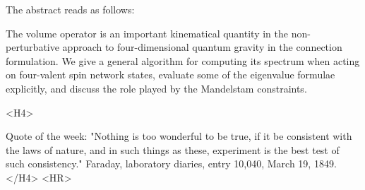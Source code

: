 The abstract reads as follows:

The volume operator is an important kinematical quantity in the
non-perturbative approach to four-dimensional quantum gravity in the
connection formulation. We give a general algorithm for computing its
spectrum when acting on four-valent spin network states, evaluate some
of the eigenvalue formulae explicitly, and discuss the role played by
the Mandelstam constraints.

<H4> 

Quote of the week: "Nothing is too wonderful to be true, if it be
consistent with the laws of nature, and in such things as these,
experiment is the best test of such consistency."  Faraday, laboratory
diaries, entry 10,040, March 19, 1849.
</H4>
<HR>



